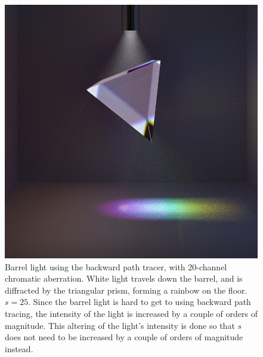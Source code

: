 \documentclass[12pt]{article}
\begin{document}
\begin{figure} 
\centering
  \includegraphics[width = 6 in]{fig11.png}
  \caption{ Barrel light using the backward path tracer, with 20-channel chromatic aberration.
White light travels down the barrel, and is diffracted by the triangular prism, forming a rainbow on the floor.
$s = 25$.
Since the barrel light is hard to get to using backward path tracing, the intensity of the light is increased by a couple of orders of magnitude.
This altering of the light's intensity is done so that $s$ does not need to be increased by a couple of orders of magnitude instead.
}
\end{figure}
\end{document}
